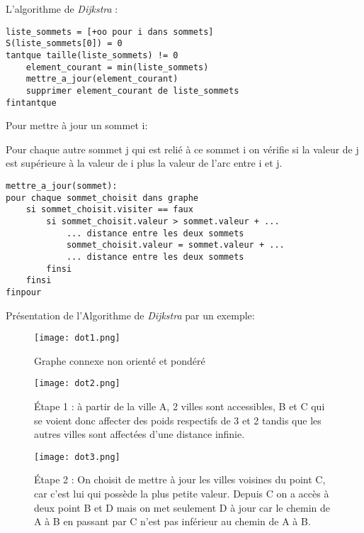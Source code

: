			L'algorithme de \emph{Dijkstra} :
			\begin{lstlisting}
liste_sommets = [+oo pour i dans sommets]
S(liste_sommets[0]) = 0
tantque taille(liste_sommets) != 0
    element_courant = min(liste_sommets)
    mettre_a_jour(element_courant)
    supprimer element_courant de liste_sommets
fintantque
			\end{lstlisting}
			Pour mettre à jour un sommet i:

				Pour chaque autre sommet j qui est relié à ce sommet i on vérifie si
				la valeur de j est supérieure à la valeur de i plus la valeur de l'arc entre i et j.

			\begin{lstlisting}
mettre_a_jour(sommet):
pour chaque sommet_choisit dans graphe
    si sommet_choisit.visiter == faux
        si sommet_choisit.valeur > sommet.valeur + ...
            ... distance entre les deux sommets
		    sommet_choisit.valeur = sommet.valeur + ...
            ... distance entre les deux sommets
        finsi
	finsi
finpour
			\end{lstlisting}


Présentation de l'Algorithme de \emph{Dijkstra} par un exemple:
\begin{figure}[h]
\begin{center}
    \texttt{[image: dot1.png]} 
    \caption{Graphe connexe non orienté et pondéré}

\end{center}
\end{figure}

\begin{figure}[h]
\begin{center}
    \texttt{[image: dot2.png]} 
    \caption{Étape 1 : à partir de la ville A, 2 villes sont accessibles, B et C qui se voient donc affecter des poids respectifs de 3 et 2 tandis que les autres villes sont affectées d'une distance infinie.}
\end{center}
\end{figure}

\begin{figure}[h]
\begin{center}
    \texttt{[image: dot3.png]} 
    \caption{Étape 2 : On choisit de mettre à jour les villes voisines du point C, car c'est lui qui possède la plus petite valeur. Depuis C on a accès à deux point B et D mais on met seulement D à jour car le chemin de A à B en passant par C n'est pas inférieur au chemin de A à B.}
\end{center}
\end{figure}

